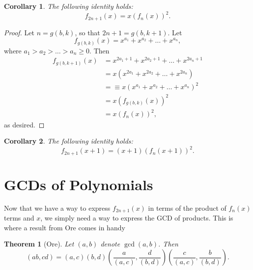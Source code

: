 \documentclass[a4paper]{article}
\newtheorem{theorem}{Theorem}
\newtheorem{corollary}{Corollary}
\begin{document}
	\begin{corollary}
		The following identity holds:
		\begin{equation*}
			f_{2n+1}(x) = x\left(f_{n}(x)\right)^2.
		\end{equation*}
	\end{corollary}
	\begin{proof}
		Let $n = g(b,k)$, so that $2n+1 = g(b,k+1)$.
		Let
		\begin{equation*}
			f_{g(b,k)}(x) = x^{a_1} + x^{a_2} + \dots + x^{a_n},
		\end{equation*}
		where $a_1 > a_2 > \dots > a_n \geq 0$.
		Then
		\begin{align*}
			f_{g(b,k+1)}(x) &= x^{2a_1 + 1} + x^{2a_2 + 1} + \dots + x^{2a_n+1} \\
				&= x\left(x^{2a_1} + x^{2a_2} + \dots + x^{2a_n}\right) \\
				&=\equiv x\left(x^{a_1} + x^{a_2} + \dots + x^{a_n}\right)^2 \\
				&= x\left(f_{g(b,k)}(x)\right)^2 \\
				&= x\left(f_{n}(x)\right)^2,
		\end{align*}
		as desired.
	\end{proof}

	\begin{corollary}
		The following identity holds:
		\begin{equation*}
			f_{2n+1}(x+1) = (x+1)\left(f_{n}(x+1)\right)^2.
		\end{equation*}
	\end{corollary}

	\section{GCDs of Polynomials}
	Now that we have a way to express $f_{2n+1}(x)$ in terms of the product of $f_{n}(x)$ terms and $x$, we simply need a way to express the GCD of products.
	This is where a result from Ore comes in handy \cite{ore_number_theory}
	
	\begin{theorem}[Ore]
		Let $(a,b)$ denote $\gcd{(a,b)}$.
		Then
		\begin{equation*}
			(ab,cd) = (a,c)(b,d)\left(\frac{a}{(a,c)},\frac{d}{(b,d)}\right)\left(\frac{c}{(a,c)},\frac{b}{(b,d)}\right).
		\end{equation*}
	\end{theorem}
\end{document}
